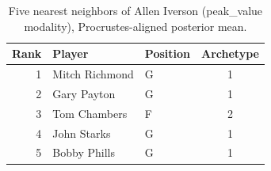 \begin{table}[htbp]
  \centering\small
  \begin{tabular}{rllc}
    \toprule
    Rank & Player & Position & Archetype \\
    \midrule
    1 & Mitch Richmond & G & 1 \\
    2 & Gary Payton & G & 1 \\
    3 & Tom Chambers & F & 2 \\
    4 & John Starks & G & 1 \\
    5 & Bobby Phills & G & 1 \\
    \bottomrule
  \end{tabular}
  \caption{Five nearest neighbors of Allen Iverson (peak_value modality), Procrustes-aligned posterior mean.}
  \label{tab:Allen_Iverson_neighbors_peak_value}
\end{table}

